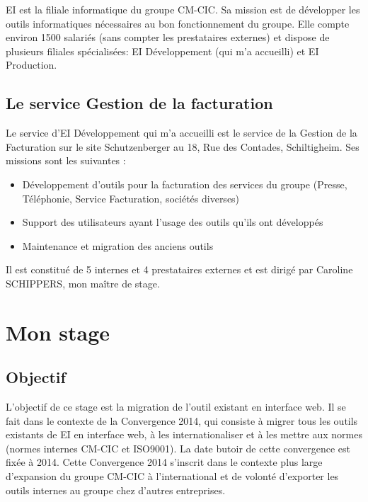 \documentclass[a4paper,french,8pt]{article}
\begin{document}
		EI est la filiale informatique du groupe CM-CIC. Sa mission est de développer les outils informatiques nécessaires au bon fonctionnement du groupe. Elle compte environ 1500 salariés 
		(sans compter les prestataires externes) et dispose de plusieurs filiales spécialisées: EI Développement (qui m'a accueilli) et EI Production.
	
	\subsection{Le service Gestion de la facturation} 
	
		Le service d'EI Développement qui m’a accueilli est le service de la Gestion de la Facturation sur le site Schutzenberger au 18, Rue des Contades, Schiltigheim.
		Ses missions sont les suivantes :
		
		\begin{itemize}
			\item Développement d’outils pour la facturation des services du groupe (Presse, Téléphonie, Service Facturation, sociétés diverses)
			\item Support des utilisateurs ayant l’usage des outils qu’ils ont développés
			\item Maintenance et migration des anciens outils\\
		\end{itemize}
		Il est constitué de 5 internes et 4 prestataires externes et est dirigé par Caroline \textsc{SCHIPPERS}, mon maître de stage.

\section{Mon stage}

	\subsection{Objectif}	
	
		L’objectif de ce stage est la migration de l’outil existant en interface web. 
		Il se fait dans le contexte de la Convergence 2014, qui consiste à migrer tous les outils existants de EI en interface web, à les internationaliser et à les mettre aux normes
		(normes internes CM-CIC et ISO9001). La date butoir de cette convergence est fixée à 2014. Cette Convergence 2014 s’inscrit dans le contexte plus large d’expansion du groupe CM-CIC 
		à l’international et de volonté d’exporter les outils internes au groupe chez d’autres entreprises.\\
	
\end{document}
